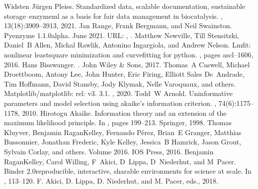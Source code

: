 \documentclass[letterpaper,12pt,english]{jupyterBook}
\begin{document}
\begin{sphinxthebibliography}{Widsten }
\sphinxAtStartPar
Jürgen Pleiss. Standardized data, scalable documentation, sustainable storage–enzymeml as a basis for fair data management in biocatalysis. , 13(18):3909–3913, 2021.
\sphinxAtStartPar
Jan Range, Frank Bergmann, and Neil Swainston. Pyenzyme 1.1.0\sphinxhyphen{}alpha. June 2021. URL: , .
\sphinxAtStartPar
Matthew Newville, Till Stensitzki, Daniel B Allen, Michal Rawlik, Antonino Ingargiola, and Andrew Nelson. Lmfit: non\sphinxhyphen{}linear least\sphinxhyphen{}square minimization and curve\sphinxhyphen{}fitting for python. , pages ascl–1606, 2016.
\sphinxAtStartPar
Hans Bisswanger. . John Wiley \& Sons, 2017.
\sphinxAtStartPar
Thomas A Caswell, Michael Droettboom, Antony Lee, John Hunter, Eric Firing, Elliott Sales De Andrade, Tim Hoffmann, David Stansby, Jody Klymak, Nelle Varoquaux, and others. Matplotlib/matplotlib: rel: v3. 3.1. , 2020.
\sphinxAtStartPar
Todd W Arnold. Uninformative parameters and model selection using akaike's information criterion. , 74(6):1175–1178, 2010.
\sphinxAtStartPar
Hirotogu Akaike. Information theory and an extension of the maximum likelihood principle. In , pages 199–213. Springer, 1998.
\sphinxAtStartPar
Thomas Kluyver, Benjamin Ragan\sphinxhyphen{}Kelley, Fernando Pérez, Brian E Granger, Matthias Bussonnier, Jonathan Frederic, Kyle Kelley, Jessica B Hamrick, Jason Grout, Sylvain Corlay, and others.  Volume 2016. IOS Press, 2016.
\sphinxAtStartPar
Benjamin Ragan\sphinxhyphen{}Kelley, Carol Willing, F Akici, D Lippa, D Niederhut, and M Pacer. Binder 2.0\sphinxhyphen{}reproducible, interactive, sharable environments for science at scale. In , 113–120. F. Akici, D. Lippa, D. Niederhut, and M. Pacer, eds., 2018.

\end{sphinxthebibliography}
\end{document}
